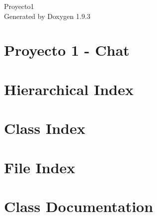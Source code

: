 \documentclass[twoside]{book}
\newcommand{\+}{\discretionary{\mbox{\scriptsize$\hookleftarrow$}}{}{}}
\newcommand{\clearemptydoublepage}{%
    \newpage{\pagestyle{empty}\cleardoublepage}%
  }
\begin{document}
  \raggedbottom
    \hypersetup{pageanchor=false,
                bookmarksnumbered=true,
                pdfencoding=unicode
               }
  \begin{titlepage}
  \vspace*{7cm}
  \begin{center}%
  {\Large Proyecto1}\\
  \vspace*{1cm}
  {\large Generated by Doxygen 1.9.3}\\
  \end{center}
  \end{titlepage}
  \clearemptydoublepage
  \tableofcontents
  \clearemptydoublepage
  \hypersetup{pageanchor=true}
\chapter{Proyecto 1 -\/ Chat}
\label{md__home_xinwen_proyecto1__chat__r_e_a_d_m_e}

\chapter{Hierarchical Index}

\chapter{Class Index}

\chapter{File Index}

\chapter{Class Documentation}



























\end{document}
